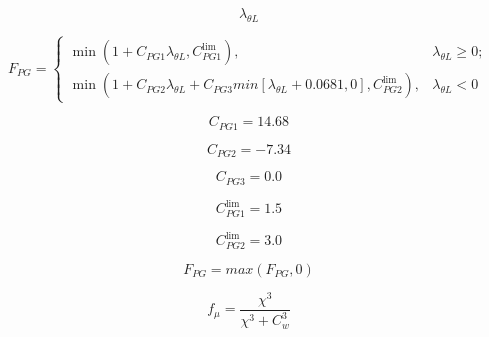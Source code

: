 {\newpage\clearpage
{}%
\begin{displaymath}
\lambda_{\theta L}
\end{displaymath}%
\lthtmldisplayZ
\lthtmlcheckvsize\clearpage}

{\newpage\clearpage
{}%
\begin{displaymath}
F_{PG}= \left\{
   \begin{array}{ll}
      \min (1+C_{PG1}\lambda _{\theta L},   C_{PG1}^{\lim }), & \lambda _{\theta L}\ge 0; \\
      \min (1+C_{PG2}\lambda _{\theta L}+C_{PG3}min[\lambda _{\theta 
      L}+0.0681, 0],   C_{PG2}^{\lim }), & \lambda _{\theta L}<0
    \end{array} \right.
\end{displaymath}%
\lthtmldisplayZ
\lthtmlcheckvsize\clearpage}

{\newpage\clearpage
{}%
\begin{displaymath}
C_{PG1}=14.68
\end{displaymath}%
\lthtmldisplayZ
\lthtmlcheckvsize\clearpage}

{\newpage\clearpage
{}%
\begin{displaymath}
C_{PG2}=-7.34
\end{displaymath}%
\lthtmldisplayZ
\lthtmlcheckvsize\clearpage}

{\newpage\clearpage
{}%
\begin{displaymath}
C_{PG3}=0.0
\end{displaymath}%
\lthtmldisplayZ
\lthtmlcheckvsize\clearpage}

{\newpage\clearpage
{}%
\begin{displaymath}
C_{PG1}^{\lim }=1.5
\end{displaymath}%
\lthtmldisplayZ
\lthtmlcheckvsize\clearpage}

{\newpage\clearpage
{}%
\begin{displaymath}
C_{PG2}^{\lim }=3.0
\end{displaymath}%
\lthtmldisplayZ
\lthtmlcheckvsize\clearpage}

{\newpage\clearpage
{}%
\begin{displaymath}
F_{PG}=max(F_{PG}, 0)
\end{displaymath}%
\lthtmldisplayZ
\lthtmlcheckvsize\clearpage}

{\newpage\clearpage
{}%
\begin{displaymath}
f_{\mu }=\frac{\chi ^{3}}{\chi ^{3}+C_{w}^{3}}
\end{displaymath}%
\lthtmldisplayZ
\lthtmlcheckvsize\clearpage}

